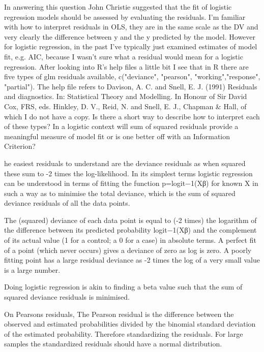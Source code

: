 

In answering this question John Christie suggested that the fit of logistic regression models should be assessed by evaluating the residuals. I'm familiar with how to interpret residuals in OLS, they are in the same scale as the DV and very clearly the difference between y and the y predicted by the model. However for logistic regression, in the past I've typically just examined estimates of model fit, e.g. AIC, because I wasn't sure what a residual would mean for a logistic regression. After looking into R's help files a little bit I see that in R there are five types of glm residuals available, c("deviance", "pearson", "working","response", "partial"). The help file refers to Davison, A. C. and Snell, E. J. (1991) Residuals and diagnostics. In: Statistical Theory and Modelling. In Honour of Sir David Cox, FRS, eds. Hinkley, D. V., Reid, N. and Snell, E. J., Chapman & Hall, of which I do not have a copy. Is there a short way to describe how to interpret each of these types? In a logistic context will sum of squared residuals provide a meaningful measure of model fit or is one better off with an Information Criterion?

he easiest residuals to understand are the deviance residuals as when squared these sum to -2 times the log-likelihood. In its simplest terms logistic regression can be understood in terms of fitting the function p=logit−1(Xβ) for known X in such a way as to minimise the total deviance, which is the sum of squared deviance residuals of all the data points.

The (squared) deviance of each data point is equal to (-2 times) the logarithm of the difference between its predicted probability logit−1(Xβ) and the complement of its actual value (1 for a control; a 0 for a case) in absolute terms. A perfect fit of a point (which never occurs) gives a deviance of zero as log is zero. A poorly fitting point has a large residual deviance as -2 times the log of a very small value is a large number.

Doing logistic regression is akin to finding a beta value such that the sum of squared deviance residuals is minimised.




On Pearsons residuals,
The Pearson residual is the difference between the observed and estimated probabilities divided by the binomial standard deviation of the estimated probability. Therefore standardizing the residuals. For large samples the standardized residuals should have a normal distribution.

